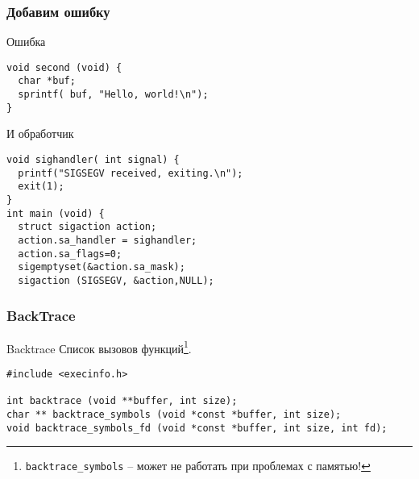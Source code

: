 %
%
%
%

\begin{frame}[fragile]
	\frametitle{Добавим ошибку}

	\begin{block}{Ошибка}
	
	\begin{lstlisting}
void second (void) {
  char *buf;
  sprintf( buf, "Hello, world!\n");
}
	\end{lstlisting}
	\end{block}
	
	\pause

	\begin{block}{И обработчик}
	\begin{lstlisting}
void sighandler( int signal) {
  printf("SIGSEGV received, exiting.\n");
  exit(1);
}
int main (void) {
  struct sigaction action;
  action.sa_handler = sighandler;
  action.sa_flags=0;
  sigemptyset(&action.sa_mask);
  sigaction (SIGSEGV, &action,NULL);
	\end{lstlisting}
	\end{block}

\end{frame}



\begin{frame}[fragile]
	\frametitle{BackTrace}

	\begin{block}{Backtrace}
		Список вызовов функций\footnote{{\tt backtrace\_symbols} -- может не работать при проблемах с памятью!}.

	\end{block}

	\begin{lstlisting}
#include <execinfo.h>

int backtrace (void **buffer, int size);
char ** backtrace_symbols (void *const *buffer, int size);
void backtrace_symbols_fd (void *const *buffer, int size, int fd);
	\end{lstlisting}
\end{frame}

